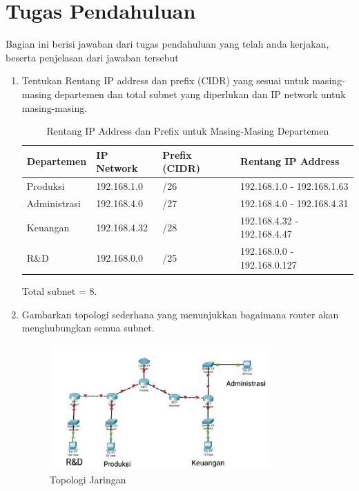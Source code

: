 \section{Tugas Pendahuluan}
Bagian ini berisi jawaban dari tugas pendahuluan yang telah anda kerjakan, beserta penjelasan dari jawaban tersebut
\begin{enumerate}
	\item Tentukan Rentang IP address dan prefix (CIDR) yang sesuai untuk masing-masing departemen dan total subnet yang diperlukan dan IP network untuk masing-masing.
	\begin{table}[H]
	\centering
	\caption{Rentang IP Address dan Prefix untuk Masing-Masing Departemen}
	\small
	\begin{tabular}{|p{3cm}|p{2.5cm}|p{2cm}|p{4cm}| }
	\hline
	\textbf{Departemen}     & \textbf{IP Network} & \textbf{Prefix (CIDR)} & \textbf{Rentang IP Address}     \\ \hline
	Produksi     & 192.168.1.0         & /26                    & 192.168.1.0 - 192.168.1.63      \\ \hline
	Administrasi & 192.168.4.0         & /27                    & 192.168.4.0 - 192.168.4.31      \\ \hline
	Keuangan     & 192.168.4.32        & /28                    & 192.168.4.32 - 192.168.4.47     \\ \hline
	R\&D         & 192.168.0.0         & /25                    & 192.168.0.0 - 192.168.0.127     \\ \hline
	\end{tabular}
	\label{tab:ip_address}
	\end{table}
	Total subnet = 8.
	
	\item Gambarkan topologi sederhana yang menunjukkan bagaimana router akan menghubungkan semua subnet.
	\begin{figure}[H]
		\centering
		\includegraphics[width=0.8\textwidth]{P1/img/image.png}
		\caption{Topologi Jaringan}
		\label{fig:topologi_sederhana}
	\end{figure}
	

\end{enumerate}
